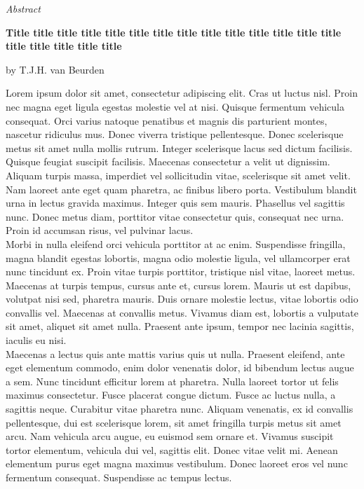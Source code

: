 \begin{center}
    
    \Huge
    \textit{Abstract}

    \vspace{1cm}
    \large
    \textbf{Title title title title title title title title title title title title title title title title title title title}
 
    \vspace{0.4cm}
    by T.J.H. van Beurden
 
    \vspace{0.9cm}
    
\end{center}
Lorem ipsum dolor sit amet, consectetur adipiscing elit. Cras ut luctus nisl. Proin nec magna eget ligula egestas molestie vel at nisi. Quisque fermentum vehicula consequat. Orci varius natoque penatibus et magnis dis parturient montes, nascetur ridiculus mus. Donec viverra tristique pellentesque. Donec scelerisque metus sit amet nulla mollis rutrum. Integer scelerisque lacus sed dictum facilisis. Quisque feugiat suscipit facilisis. Maecenas consectetur a velit ut dignissim. Aliquam turpis massa, imperdiet vel sollicitudin vitae, scelerisque sit amet velit. Nam laoreet ante eget quam pharetra, ac finibus libero porta. Vestibulum blandit urna in lectus gravida maximus. Integer quis sem mauris. Phasellus vel sagittis nunc. Donec metus diam, porttitor vitae consectetur quis, consequat nec urna. Proin id accumsan risus, vel pulvinar lacus.\\
\newline
Morbi in nulla eleifend orci vehicula porttitor at ac enim. Suspendisse fringilla, magna blandit egestas lobortis, magna odio molestie ligula, vel ullamcorper erat nunc tincidunt ex. Proin vitae turpis porttitor, tristique nisl vitae, laoreet metus. Maecenas at turpis tempus, cursus ante et, cursus lorem. Mauris ut est dapibus, volutpat nisi sed, pharetra mauris. Duis ornare molestie lectus, vitae lobortis odio convallis vel. Maecenas at convallis metus. Vivamus diam est, lobortis a vulputate sit amet, aliquet sit amet nulla. Praesent ante ipsum, tempor nec lacinia sagittis, iaculis eu nisi.\\
\newline
Maecenas a lectus quis ante mattis varius quis ut nulla. Praesent eleifend, ante eget elementum commodo, enim dolor venenatis dolor, id bibendum lectus augue a sem. Nunc tincidunt efficitur lorem at pharetra. Nulla laoreet tortor ut felis maximus consectetur. Fusce placerat congue dictum. Fusce ac luctus nulla, a sagittis neque. Curabitur vitae pharetra nunc. Aliquam venenatis, ex id convallis pellentesque, dui est scelerisque lorem, sit amet fringilla turpis metus sit amet arcu. Nam vehicula arcu augue, eu euismod sem ornare et. Vivamus suscipit tortor elementum, vehicula dui vel, sagittis elit. Donec vitae velit mi. Aenean elementum purus eget magna maximus vestibulum. Donec laoreet eros vel nunc fermentum consequat. Suspendisse ac tempus lectus.